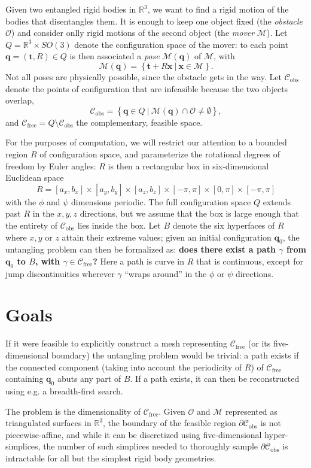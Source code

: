 \documentclass[review]{acmsiggraph}
\newcommand{\cm}{\mathcal{M}}
\newcommand{\bx}{\mathbf{x}}
\newcommand{\bt}{\mathbf{t}}
\newcommand{\bq}{\mathbf{q}}
\newcommand{\Cfree}{\mathcal{C}_{\mathrm{free}}}
\newcommand{\Cobs}{\mathcal{C}_{\mathrm{obs}}}
\newcommand{\co}{\mathcal{O}}
\begin{document}
Given two entangled rigid bodies in $\mathbb{R}^3$, we want to find a rigid motion of the bodies that disentangles them. It is enough to keep one object fixed (the \emph{obstacle} $\co$) and consider onlly rigid motions of the second object (the \emph{mover} $\cm$). Let $Q = \mathbb{R}^3 \times SO(3)$ denote the configuration space of the mover: to each point $\bq = (\bt, R)\in Q$ is then associated a \emph{pose} $\cm(\bq)$ of $\cm$, with
$$\cm(\bq) = \left\{ \bt + R\bx\ \vert \ \bx \in \cm\right\}.$$
Not all poses are physically possible, since the obstacle gets in the way. Let $\Cobs$ denote the points of configuration that are infeasible because the two objects overlap,
$$\Cobs = \left\{\bq \in Q \ \vert \ \cm(\bq) \cap \co \neq \emptyset\right\},$$
and $\Cfree = Q \setminus \Cobs$ the complementary, feasible space. 

For the purposes of computation, we will restrict our attention to a bounded region $R$ of configuration space, and parameterize the rotational degrees of freedom by Euler angles: $R$ is then a rectangular box in six-dimensional Euclidean space
$$R = [a_x, b_x] \times [a_y, b_y] \times [a_z, b_z] \times [-\pi,\pi] \times [0,\pi] \times [-\pi,\pi]$$
with the $\phi$ and $\psi$ dimensions periodic. The full configuration space $Q$ extends past $R$ in the $x,y,z$ directions, but we assume that the box is large enough that the entirety of $\Cobs$ lies inside the box. Let $B$ denote the six hyperfaces of $R$ where $x,y$ or $z$ attain their extreme values; given an initial configuration $\bq_0$, the untangling problem can then be formalized as: \textbf{does there exist a path $\gamma$ from $\bq_0$ to $B$, with $\gamma \in \Cfree$?} Here a path is curve in $R$ that is continuous, except for jump discontinuities wherever $\gamma$ ``wraps around'' in the $\phi$ or $\psi$ directions.
\section{Goals}
If it were feasible to explicitly construct a mesh representing $\Cfree$ (or its five-dimensional boundary) the untangling problem would be trivial: a path exists if the connected component (taking into account the periodicity of $R$) of $\Cfree$ containing $\bq_0$ abuts any part of $B$. If a path exists, it can then be reconstructed using e.g. a breadth-first search.

The problem is the dimensionality of $\Cfree$. Given $\co$ and $\cm$ represented as triangulated surfaces in $\mathbb{R}^3$, the boundary of the feasible region $\partial \Cobs$ is not piecewise-affine, and while it can be discretized using five-dimensional hyper-simplices, the number of such simplices needed to thoroughly sample $\partial \Cobs$ is intractable for all but the simplest rigid body geometries.
\end{document}
